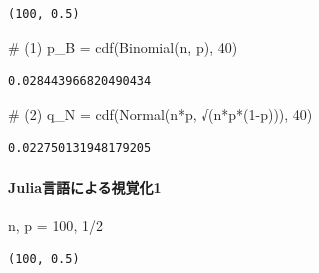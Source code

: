 \documentclass[
  letterpaper,
  DIV=11,
  numbers=noendperiod]{scrartcl}
\let\oldparagraph\paragraph
\renewcommand{\paragraph}[1]{\oldparagraph{#1}\mbox{}}
\newenvironment{Shaded}{\begin{snugshade}}{\end{snugshade}}
\newcommand{\CommentTok}[1]{\textcolor[rgb]{0.37,0.37,0.37}{#1}}
\newcommand{\FloatTok}[1]{\textcolor[rgb]{0.68,0.00,0.00}{#1}}
\newcommand{\FunctionTok}[1]{\textcolor[rgb]{0.28,0.35,0.67}{#1}}
\newcommand{\NormalTok}[1]{\textcolor[rgb]{0.00,0.23,0.31}{#1}}
\newcommand{\OperatorTok}[1]{\textcolor[rgb]{0.37,0.37,0.37}{#1}}
\begin{document}
\begin{verbatim}
(100, 0.5)
\end{verbatim}

\begin{Shaded}
\begin{Highlighting}[]
\CommentTok{\# (1)}
\NormalTok{p\_B }\OperatorTok{=} \FunctionTok{cdf}\NormalTok{(}\FunctionTok{Binomial}\NormalTok{(n, p), }\FloatTok{40}\NormalTok{)}
\end{Highlighting}
\end{Shaded}

\begin{verbatim}
0.028443966820490434
\end{verbatim}

\begin{Shaded}
\begin{Highlighting}[]
\CommentTok{\# (2)}
\NormalTok{q\_N }\OperatorTok{=} \FunctionTok{cdf}\NormalTok{(}\FunctionTok{Normal}\NormalTok{(n}\OperatorTok{*}\NormalTok{p, }\FunctionTok{√}\NormalTok{(}\FunctionTok{n*p*}\NormalTok{(}\FloatTok{1}\OperatorTok{{-}}\NormalTok{p))), }\FloatTok{40}\NormalTok{)}
\end{Highlighting}
\end{Shaded}

\begin{verbatim}
0.022750131948179205
\end{verbatim}

\hypertarget{juliaux8a00ux8a9eux306bux3088ux308bux8996ux899aux53161}{%
\paragraph{Julia言語による視覚化1}\label{juliaux8a00ux8a9eux306bux3088ux308bux8996ux899aux53161}}

\begin{Shaded}
\begin{Highlighting}[]
\NormalTok{n, p }\OperatorTok{=} \FloatTok{100}\NormalTok{, }\FloatTok{1}\OperatorTok{/}\FloatTok{2}
\end{Highlighting}
\end{Shaded}

\begin{verbatim}
(100, 0.5)
\end{verbatim}
\end{document}
